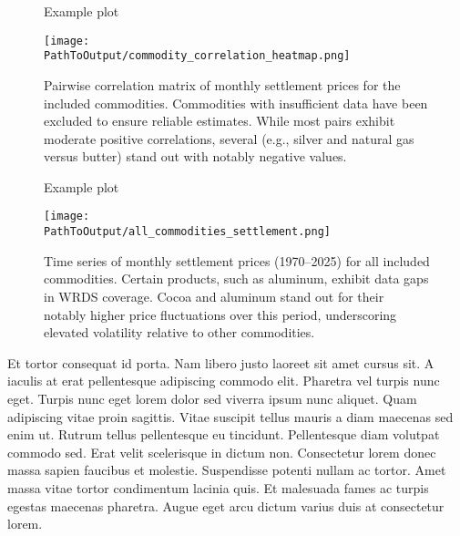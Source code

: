 \documentclass[12pt]{article}
\begin{document}
  
\newpage


\begin{figure}[ht!]
  \centering
  \caption{Example plot}
  \begin{adjustbox}{max width=\textwidth}
  \texttt{[image: \\PathToOutput/commodity\_correlation\_heatmap.png]}
  \end{adjustbox}
  \caption*{Pairwise correlation matrix of monthly settlement prices for the included commodities. Commodities 
  with insufficient data have been excluded to ensure reliable estimates. While most pairs exhibit moderate 
  positive correlations, several (e.g., silver and natural gas versus butter) stand out with notably negative values.}
\end{figure}

\begin{figure}[ht!]
  \centering
  \caption{Example plot}
  \begin{adjustbox}{max width=\textwidth}
  \texttt{[image: \\PathToOutput/all\_commodities\_settlement.png]}
  \end{adjustbox}
  \caption*{Time series of monthly settlement prices (1970–2025) for all included commodities. 
  Certain products, such as aluminum, exhibit data gaps in WRDS coverage. Cocoa and aluminum 
  stand out for their notably higher price fluctuations over this period, underscoring elevated 
  volatility relative to other commodities.}
  \label{fig:all_commodities_settlement}
\end{figure}  

\FloatBarrier

\newpage
Et tortor consequat id porta. Nam libero justo laoreet sit amet cursus sit. A
iaculis at erat pellentesque adipiscing commodo elit. Pharetra vel turpis
nunc eget. Turpis nunc eget lorem dolor sed viverra ipsum nunc aliquet. Quam
adipiscing vitae proin sagittis. Vitae suscipit tellus mauris a diam maecenas
sed enim ut. Rutrum tellus pellentesque eu tincidunt. Pellentesque diam
volutpat commodo sed. Erat velit scelerisque in dictum non. Consectetur lorem
donec massa sapien faucibus et molestie. Suspendisse potenti nullam ac
tortor. Amet massa vitae tortor condimentum lacinia quis. Et malesuada fames
ac turpis egestas maecenas pharetra. Augue eget arcu dictum varius duis at
consectetur lorem.




\end{document}
